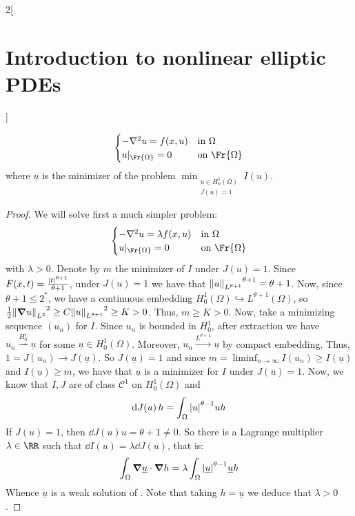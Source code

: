 \documentclass[../../../main_math.tex]{subfiles}
\begin{document}
\begin{multicols}{2}[\section{Introduction to nonlinear elliptic PDEs}]
\begin{proposition}[Aplication]
    \begin{equation}\label{INEPDE:problem_lagrange_apl}
      \begin{cases}
        -\laplacian u=f(x,u) & \text{in }\Omega      \\
        u|_{\Fr{\Omega}}=0   & \text{on }\Fr{\Omega}
      \end{cases}
    \end{equation}
    where $\underline{u}$ is the minimizer of the problem
    $\displaystyle
      \min_{\substack{u\in H_0^1(\Omega) \\ J(u)=1}}I(u)
    $.
  \end{proposition}
  \begin{proof}
    We will solve first a much simpler problem:
    \begin{equation}\label{INEPDE:aux_problem_lagrange}
      \begin{cases}
        -\laplacian u=\lambda f(x,u) & \text{in }\Omega      \\
        u|_{\Fr{\Omega}}=0           & \text{on }\Fr{\Omega}
      \end{cases}
    \end{equation}
    with $\lambda>0$. Denote by $m$ the minimizer of $I$ under $J(u)=1$. Since $F(x,t)=\frac{\abs{t}^{\theta+1}}{\theta+1}$, under $J(u)=1$ we have that ${\norm{u}_{L^{\theta+1}}}^{\theta+1}=\theta+1$. Now, since $\theta+1\leq 2^*$, we have a continuous embedding $H_0^1(\Omega)\hookrightarrow L^{\theta+1}(\Omega)$, so $\frac{1}{2}{\norm{\grad u}_{L^2}}^2\geq C {\norm{u}_{L^{\theta+1}}}^2\geq K>0$. Thus, $m\geq K>0$. Now, take a minimizing sequence $(u_n)$ for $I$. Since $u_n$ is bounded in $H_0^1$, after extraction we have $u_n\overset{H_0^1}{\rightharpoonup} \underline{u}$ for some $\underline{u}\in H_0^1(\Omega)$. Moreover, $u_n\overset{L^{\theta+1}}{\to} \underline{u}$ by compact embedding. Thus, $1=J(u_n)\to J(\underline{u})$. So $J(\underline{u})=1$ and since $m=\displaystyle\liminf_{n\to\infty}I(u_n)\geq I(\underline{u})$ and $I(\underline{u})\geq m$, we have that $\underline{u}$ is a minimizer for $I$ under $J(u)=1$. Now, we know that $I,J$ are of class $\mathcal{C}^1$ on $H_0^1(\Omega)$ and
    $$
      \dd{J(u)}h = \int_\Omega \abs{u}^{\theta-1}uh
    $$
    If $J(u)=1$, then $\dd{J(u)}u=\theta+1\ne 0$. So there is a Lagrange multiplier $\lambda\in\RR$ such that $\dd{I(u)}=\lambda \dd{J(u)}$, that is:
    $$
      \int_\Omega \grad \underline{u}\cdot \grad h=\lambda \int_\Omega \abs{\underline{u}}^{\theta-1}\underline{u}h
    $$
    Whence $\underline{u}$ is a weak solution of . Note that taking $h=\underline{u}$ we deduce that $\lambda>0$.


\end{proof}
\end{multicols}
\end{document}

